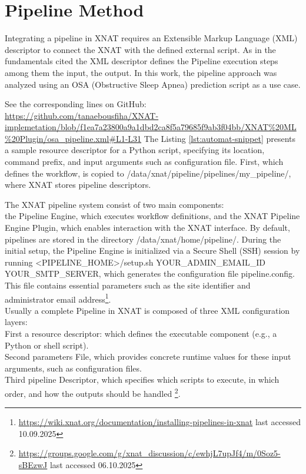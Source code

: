 
\section{Pipeline Method}

Integrating a pipeline in XNAT requires an Extensible Markup Language (XML) descriptor to connect the XNAT with the defined external script. As in the fundamentals cited the XML descriptor defines the Pipeline execution steps among them the input, the output. In this work, the pipeline approach was analyzed using an OSA (Obstructive Sleep Apnea) prediction script as a use case.
\normalsize



\noindent\footnotesize See the corresponding lines on GitHub:\url{ https://github.com/tanaebousfiha/XNAT-implemetation/blob/f1ea7a23800a9a1dbd2ca8f5a79685f9ab3f04bb/XNAT%20ML%20Plugin/osa_pipeline.xml#L1-L31}
\normalsize
The  Listing \ref{lst:automat-snippet} presents a sample resource descriptor for a Python script, specifying its location, command prefix, and input arguments such as configuration file. First, which defines the workflow, is copied to /data/xnat/pipeline/pipelines/my\_pipeline/, where XNAT stores pipeline descriptors. 

The XNAT pipeline system consist of two main components: \\
the Pipeline Engine, which executes workflow definitions, and the XNAT Pipeline Engine Plugin, which enables interaction with the XNAT interface.
By default, pipelines are stored in the directory /data/xnat/home/pipeline/. During the initial setup, the Pipeline Engine is initialized via a Secure Shell (SSH) session by running
<PIPELINE\_HOME>/setup.sh YOUR\_ADMIN\_EMAIL\_ID YOUR\_SMTP\_SERVER,
which generates the configuration file pipeline.config. This file contains essential parameters such as the site identifier and administrator email address\footnote{\url{https://wiki.xnat.org/documentation/installing-pipelines-in-xnat} last accessed 10.09.2025}.\\
Usually a complete Pipeline in XNAT is composed of three XML configuration layers:\\
First a resource descriptor: which defines the executable component (e.g., a Python or shell script). \\
Second parameters File, which provides concrete runtime values for these input arguments, such as configuration files.\\
Third pipeline Descriptor, which  specifies which scripts to execute, in which order, and how the outputs should be handled \footnote{\url{https://groups.google.com/g/xnat_discussion/c/ewhjL7upJf4/m/0Soz5-sBEzwJ} last accessed 06.10.2025}.\\

